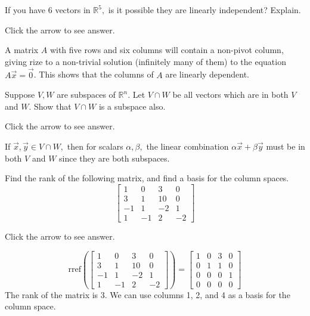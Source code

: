 \documentclass{ximera}
\begin{document}
\begin{problem}\label{prb:5.25} If you have $6$ vectors in $\mathbb{R}^{5},$ is it possible they are
linearly independent? Explain.

Click the arrow to see answer.  
\begin{expandable}{}{}
A matrix $A$ with five rows and six columns will contain a non-pivot column, giving rize to a non-trivial solution (infinitely many of them) to the equation $A\vec{x}=\vec{0}$.  This shows that the columns of $A$ are linearly dependent.
\end{expandable}
\end{problem}

\begin{problem}\label{prb:5.27} Suppose $V, W$ are subspaces of $\mathbb{R}^{n}.$ Let $V\cap W$
be all vectors which are in both $V$ and $W$. Show that $V \cap W$ is a subspace also.

Click the arrow to see answer.  
\begin{expandable}{}{}
If $\vec{x}, \vec{y}\in V\cap W,$ then for scalars $\alpha
,\beta ,$ the linear combination $\alpha \vec{x}+\beta \vec{y}$ must
be in both $V$ and $W$ since they are both subspaces.
\end{expandable}
\end{problem}

\begin{problem}\label{prb:5.37} Find the rank of the following matrix, and find a basis for the column spaces.
\begin{equation*}
\left[
\begin{array}{rrrr}
1 & 0 & 3 & 0 \\
3 & 1 & 10 & 0 \\
-1 & 1 & -2 & 1 \\
1 & -1 & 2 & -2
\end{array}
\right]
\end{equation*}

Click the arrow to see answer.  

\begin{expandable}{}{}
$$\text{rref}\left(\begin{bmatrix}
1 & 0 & 3 & 0 \\
3 & 1 & 10 & 0 \\
-1 & 1 & -2 & 1 \\
1 & -1 & 2 & -2
\end{bmatrix}\right)=\begin{bmatrix}1 &0 &3 &0\\
 0& 1& 1& 0\\
 0& 0& 0& 1\\
 0& 0& 0& 0\end{bmatrix}$$
 The rank of the matrix is 3.  We can use columns 1, 2, and 4 as a basis for the column space.
\end{expandable}
\end{problem}
\end{document}
